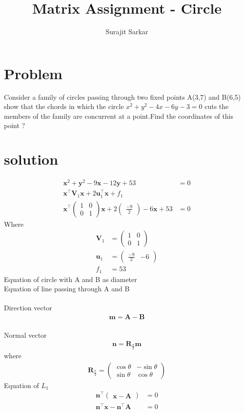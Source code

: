 \documentclass[journal,12pt,twocolumn]{IEEEtran}
\title{\mytitle}
\title
{
Matrix Assignment - Circle
}
\author{Surajit Sarkar}
\newcommand{\myvec}[1]{\ensuremath{\begin{pmatrix}#1\end{pmatrix}}}
\let\vec\mathbf
\begin{document}
\maketitle
\tableofcontents
\bigskip


\section{\textbf{Problem}}
Consider a family of circles passing through two fixed points A(3,7) and B(6,5) show that the chords in which the circle $x^2+y^2-4x-6y-3=0$ cuts the members of the family are concurrent at a point.Find the coordinates of this point ?
\section{\textbf{solution}}
\begin{align}
    \vec{x}^2+\vec{y}^2-9\vec{x}-12\vec{y}+53&=0\\
    \vec{x}^{\top}\vec{V}_1\vec{x}+2\vec{u}_1^{\top}\vec{x}+f_1&\\
    \vec{x}^{\top}\myvec{1&0\\0&1}{\vec{x}+2\myvec{\frac{-9}{2}}-6}\vec{x}+ 53&=0
\end{align}
Where
\begin{align}
    \vec{V}_1&=\myvec{1&0\\0&1}\\
    \vec{u}_1&=\myvec{\frac{-9}{2}&-6}\\
    f_1&=53
\end{align}
Equation of circle with A and B as diameter\\
Equation of line passing through A and B
\\ 
\\Direction vector  
  \begin{align}
    \vec{m}=\vec{A}-\vec{B}
\end{align}
\\Normal vector
\begin{align}
    \vec{n}=\vec{R}_{\frac{\pi}{2}}\vec{m}
\end{align}
where
\begin{align}
\vec{R}_{\frac{\pi}{2}}=\myvec{\cos\theta&-\sin\theta\\ \sin\theta&\cos\theta}
\end{align}
Equation of $L_1$
\begin{align}
    \vec{n}^{\top}\myvec{\vec{x}-\vec{A}}&=0\\
    \vec{n}^{\top}\vec{x}-\vec{n}^{\top}\vec{A}&=0
\end{align}
\end{document}
